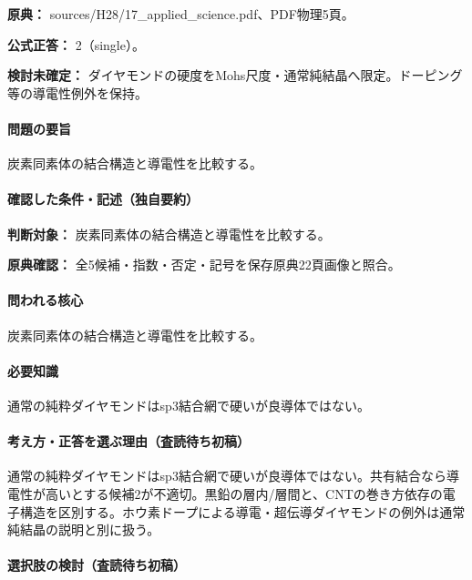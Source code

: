 \noindent\textbf{原典：} sources/H28/17\_applied\_science.pdf、PDF物理5頁。

\textbf{公式正答：} 2（single）。

\par\textbf{検討未確定：} ダイヤモンドの硬度をMohs尺度・通常純結晶へ限定。ドーピング等の導電性例外を保持。

\paragraph{問題の要旨} 炭素同素体の結合構造と導電性を比較する。

\paragraph{確認した条件・記述（独自要約）}\mbox{}\par

\noindent\textbf{判断対象：} 炭素同素体の結合構造と導電性を比較する。\par

\noindent\textbf{原典確認：} 全5候補・指数・否定・記号を保存原典22頁画像と照合。\par

\paragraph{問われる核心} 炭素同素体の結合構造と導電性を比較する。

\paragraph{必要知識} 通常の純粋ダイヤモンドはsp3結合網で硬いが良導体ではない。

\paragraph{考え方・正答を選ぶ理由（査読待ち初稿）} 通常の純粋ダイヤモンドはsp3結合網で硬いが良導体ではない。共有結合なら導電性が高いとする候補2が不適切。黒鉛の層内/層間と、CNTの巻き方依存の電子構造を区別する。ホウ素ドープによる導電・超伝導ダイヤモンドの例外は通常純結晶の説明と別に扱う。

\paragraph{選択肢の検討（査読待ち初稿）}\mbox{}\par

